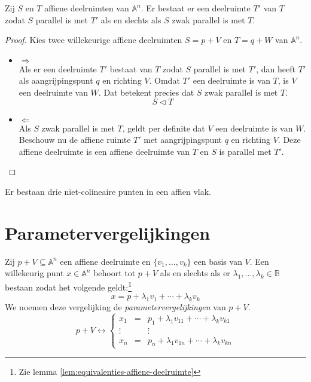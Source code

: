 \documentclass[main.tex]{subfiles}
\begin{document}
\begin{st}
  Zij $S$ en $T$ affiene deelruimten van $\mathbb{A}^{n}$.
  Er bestaat er een deelruimte $T'$ van $T$ zodat $S$ parallel is met $T'$ als en slechts als $S$ zwak parallel is met $T$.

  \begin{proof}
    Kies twee willekeurige affiene deelruimten $S = p + V$ en $T = q + W$ van $\mathbb{A}^{n}$.
    \begin{itemize}
    \item $\Rightarrow$\\
      Als er een deelruimte $T'$ bestaat van $T$ zodat $S$ parallel is met $T'$, dan heeft $T'$ als aangrijpingspunt $q$ en richting $V$.
      Omdat $T'$ een deelruimte is van $T$, is $V$ een deelruimte van $W$.
      Dat betekent precies dat $S$ zwak parallel is met $T$.
      \[ S \vartriangleleft T \]
    \item $\Leftarrow$\\
      Als $S$ zwak parallel is met $T$, geldt per definite dat $V$ een deelruimte is van $W$.
      Beschouw nu de affiene ruimte $T'$ met aangrijpingspunt $q$ en richting $V$.
      Deze affiene deelruimte is een affiene deelruimte van $T$ en $S$ is parallel met $T'$.
    \end{itemize}
  \end{proof}
\end{st}

\begin{st}
  Er bestaan drie niet-colineaire punten in een affien vlak.
\end{st}

\section{Parametervergelijkingen}
\label{sec:parametervergelijkingen}
\begin{de}
  Zij $p+V \subseteq \mathbb{A}^{n}$ een affiene deelruimte en $\{v_{1},\dotsc,v_{k}\}$ een basis van $V$.
  Een willekeurig punt $x\in \mathbb{A}^{n}$ behoort tot $p+V$ als en slechts als er $\lambda_{1},\dotsc,\lambda_{k} \in \mathbb{B}$ bestaan zodat het volgende geldt:\footnote{Zie lemma \ref{lem:equivalenties-affiene-deelruimte}}
  \[
  x = p + \lambda_1v_1 + \dotsb + \lambda_{k}v_{k}  
  \]
  We noemen deze vergelijking de \emph{parametervergelijkingen} van $p+V$.
  \[
  p+V \leftrightarrow
  \left\{
  \begin{array}{rcl}
  x_{1} &=& p_{1} + \lambda_{1}v_{11} + \dotsb + \lambda_{k}v_{k1}\\
  \vdots && \vdots\\
  x_{n} &=& p_{n} + \lambda_{1}v_{1n} + \dotsb + \lambda_{k}v_{kn}
  \end{array}
  \right.
  \]
\end{de}
\end{document}
